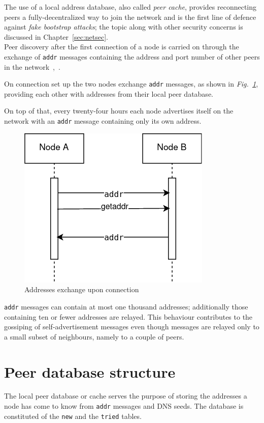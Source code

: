 The use of a local address database, also called \emph{peer cache}, provides reconnecting peers a fully-decentralized way to join the network and is the first line of defence against \emph{fake bootstrap attacks}; the topic along with other security concerns is discussed in Chapter~\ref{sec:netsec}.\\

Peer discovery after the first connection of a node is carried on through the exchange of \texttt{addr} messages containing the address and port number of other peers in the network~\cite{protocoldoc},~\cite{devguidep2p}.

On connection set up the two nodes exchange \texttt{addr} messages, as shown in \emph{Fig.~\ref{fig:addr}}, providing each other with addresses from their local peer database.

On top of that, every twenty-four hours each node advertises itself on the network with an \texttt{addr} message containing only its own address.

\begin{figure}[h]
	\includegraphics[width=.45\textwidth]{pict/BTCaddr.png}
	\centering
	\caption{Addresses exchange upon connection}
	\label{fig:addr}
\end{figure}

\texttt{addr} messages can contain at most one thousand addresses; additionally those containing ten or fewer addresses are relayed. This behaviour contributes to the gossiping of self-advertisement messages even though messages are relayed only to a small subset of neighbours, namely to a couple of peers.

\section{Peer database structure}\label{sec:cachestruct}
The local peer database or cache serves the purpose of storing the addresses a node has come to know from \texttt{addr} messages and DNS seeds. The database is constituted of the \texttt{new} and the \texttt{tried} tables.


